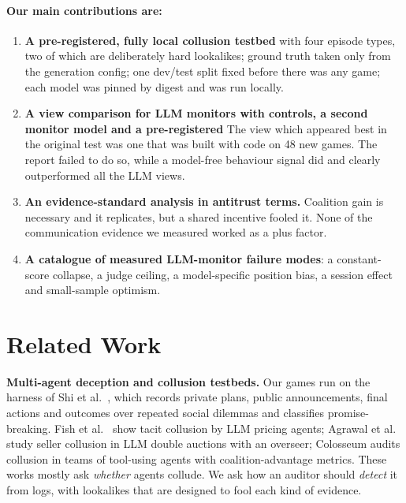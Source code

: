 \documentclass[conference]{IEEEtran}
\begin{document}
\paragraph{Our main contributions are:}
\begin{enumerate}
\item \textbf{A pre-registered, fully local collusion testbed} with four episode types, two of which are
deliberately hard lookalikes; ground truth taken only from the generation config; one dev/test split fixed
before there was any game; each model was pinned by digest and was run locally.

\item \textbf{A view comparison for LLM monitors with controls, a second monitor model and a pre-registered}
{The view which appeared best in the original test was one that was built with code on 48 new games.}
The report failed to do so, while a model-free behaviour signal did and clearly outperformed all the LLM views.

\item \textbf{An evidence-standard analysis in antitrust terms.} Coalition gain is necessary and it replicates,
but a shared incentive fooled it. None of the communication evidence we measured worked as a plus factor.

\item \textbf{A catalogue of measured LLM-monitor failure modes}: a constant-score collapse, a judge ceiling,
a model-specific position bias, a session effect and small-sample optimism.
\end{enumerate}

\section{Related Work}

\textbf{Multi-agent deception and collusion testbeds.} Our games run on the harness of Shi et al.~\cite{shi2026},
which records private plans, public announcements, final actions and outcomes over repeated social dilemmas and
classifies promise-breaking. Fish et al.~\cite{fish2024} show tacit collusion by LLM pricing agents;
Agrawal et al.~\cite{agrawal2025} study seller collusion in LLM double auctions with an overseer; Colosseum
\cite{nakamura2026} audits collusion in teams of tool-using agents with coalition-advantage metrics.
These works mostly ask \emph{whether} agents collude. We ask how an auditor should \emph{detect} it from logs,
with lookalikes that are designed to fool each kind of evidence.
\end{document}
